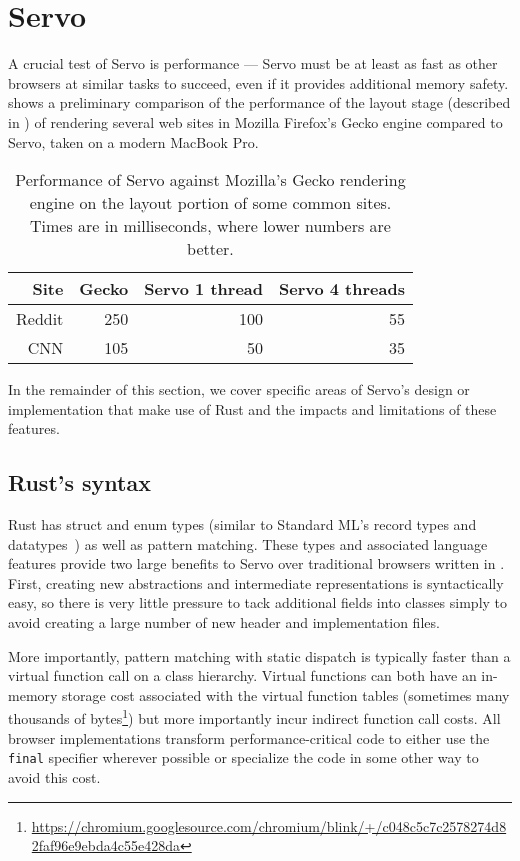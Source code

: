 \section{Servo}
\label{sec:servo}
A crucial test of Servo is performance --- Servo must be at least as fast
as other browsers at similar tasks to succeed, even if it provides additional memory safety.
 shows a preliminary comparison of the performance of the layout stage (described
in ) of rendering several web sites in Mozilla Firefox's Gecko engine compared
to Servo, taken on a modern MacBook Pro.
\begin{table}
  \begin{center}
    \begin{tabular}{r || r | r | r}
      Site & Gecko & Servo 1 thread & Servo 4 threads \\
      \hline
      Reddit & 250 & 100 & 55  \\
      CNN & 105 & 50 & 35 \\
    \end{tabular}%
  \end{center}%
  \caption{Performance of Servo against Mozilla's Gecko rendering engine on the layout portion of some common sites.
  Times are in milliseconds, where lower numbers are better.}
  \label{servo-perf}
\end{table}

In the remainder of this section, we cover specific areas of Servo's design or implementation that make use of
Rust and the impacts and limitations of these features.

\subsection{Rust's syntax}
Rust has struct and enum types (similar to Standard ML's record types and datatypes~\cite{sml97-definition}) as
well as pattern matching.
These types and associated language features provide two large benefits to Servo over traditional browsers
written in \Cplusplus{}.
First, creating new abstractions and intermediate representations is syntactically easy, so there is very little
pressure to tack additional fields into classes simply to avoid creating a large number of new header and implementation
files.

More importantly, pattern matching with static dispatch is typically faster than a virtual function call on a class
hierarchy.
Virtual functions can both have an in-memory storage cost associated with the virtual function tables (sometimes many thousands of bytes\footnote{\url{https://chromium.googlesource.com/chromium/blink/+/c048c5c7c2578274d82faf96e9ebda4c55e428da}}) but more importantly
incur indirect function call costs.
All \Cplusplus{} browser implementations transform performance-critical code to either use the \lstinline[language=C]{final}
specifier wherever possible or specialize the code in some other way to avoid this cost.

